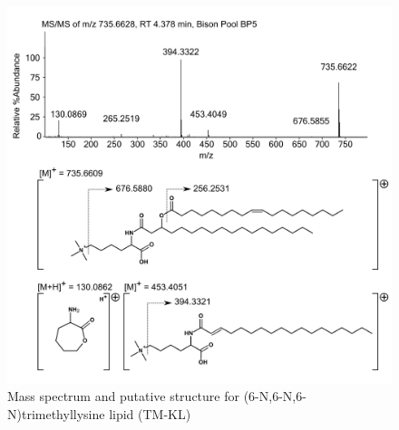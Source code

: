 \begin{figure}[h]
\centering
\includegraphics[width=\linewidth]{figs_app1/TM-KL}
\caption{Mass spectrum and putative structure for (6-N,6-N,6-N)trimethyllysine lipid (TM-KL)}
\label{fig:TM-KL}
\end{figure}

